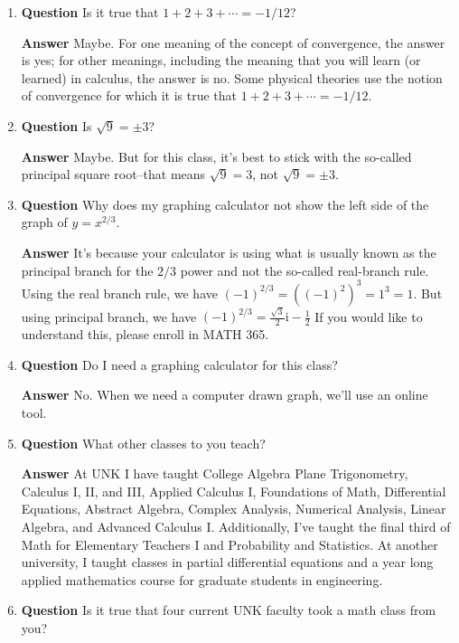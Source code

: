 \documentclass[12pt]{article}
\newcounter{ex}\setcounter{ex}{0}
\newcounter{cd}\setcounter{cd}{24}
\begin{document}
\begin{enumerate}
\item  \textbf{Question} Is it true that \(1 + 2 + 3 + \cdots = -1/12\)?

  \textbf{Answer}  Maybe. For one meaning of the concept of convergence, the answer is yes; for other meanings, including the meaning that you will learn (or learned)  in calculus, the answer is no.  Some physical theories use the notion of convergence for which it is true that \(1 + 2 + 3 + \cdots = -1/12\).

\item  \textbf{Question} Is \(\sqrt{9} = \pm 3\)?

  \textbf{Answer}  Maybe.  But for this class, it's best to stick with the so-called principal square root--that means \(\sqrt{9} = 3\), not  \(\sqrt{9} = \pm 3\).

\item  \textbf{Question} Why does my graphing calculator not show the left side of the graph of \(y = x^{2/3}\). 

\textbf{Answer} It's because your calculator is using what is usually known as the principal branch for the \(2/3\) power and not the so-called real-branch rule.  Using the real branch rule,
we have \((-1)^{2/3} = ((-1)^2)^3 = 1^3 = 1\). But using principal branch, we have \((-1)^{2/3} = \frac{\sqrt{3}}{2}  \mathrm{i}  -\frac{1}{2}\) If you would like to understand this, please enroll in MATH 365.

\item \textbf{Question} Do I need a graphing calculator for this class?

\textbf{Answer} No. When we need a computer drawn graph, we'll use an online tool.

\item \textbf{Question} What other classes to you teach?

\textbf{Answer} At UNK I have taught College Algebra 
   Plane Trigonometry, Calculus I, II, and III, Applied Calculus I,
   Foundations of Math, Differential Equations, Abstract Algebra, Complex Analysis,
   Numerical Analysis, Linear Algebra, and Advanced Calculus I. Additionally, I've
   taught the final third of Math for Elementary Teachers I and  Probability and Statistics.
   At another university, I taught classes in partial differential equations and a
   year long applied mathematics course for graduate students in engineering.

\item  \textbf{Question} Is it true that four current UNK faculty took a math class from you?


\end{enumerate}
\end{document}
